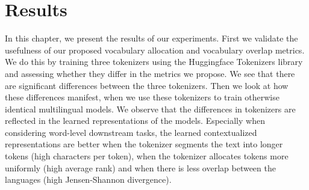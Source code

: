 \chapter{Results}



In this chapter, we present the results of our experiments. First we validate the usefulness of our proposed vocabulary allocation and vocabulary overlap metrics. We do this by training three tokenizers using the Huggingface Tokenizers library and assessing whether they differ in the metrics we propose. We see that there are significant differences between the three tokenizers. Then we look at how these differences manifest, when we use these tokenizers to train otherwise identical multilingual models. We observe that the differences in tokenizers are reflected in the learned representations of the models. Especially when considering word-level downstream tasks, the learned contextualized representations are better when the tokenizer segments the text into longer tokens (high characters per token), when the tokenizer allocates tokens more uniformly (high average rank) and when there is less overlap between the languages (high Jensen-Shannon divergence).

